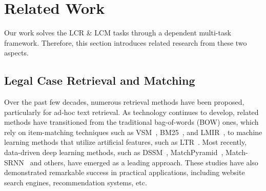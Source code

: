 \section{Related Work}
\label{sec:related_work}
Our work solves the LCR \& LCM tasks through a dependent multi-task framework.
Therefore, this section introduces related research from these two aspects.



\subsection{Legal Case Retrieval and Matching}
Over the past few decades, numerous retrieval methods have been proposed, particularly for ad-hoc text retrieval.
As technology continues to develop, related methods have transitioned from the traditional bag-of-words (BOW) ones, which rely on item-matching techniques such as VSM~\cite{salton1988VSM}, BM25~\cite{robertson1994BM25}, and LMIR~\cite{song1999LMIR}, to machine learning methods that utilize artificial features, such as LTR~\cite{liu2009LTR}.
Most recently, data-driven deep learning methods, such as DSSM~\cite{hu2014DSSM}, MatchPyramid~\cite{pang2016MatchPyramid}, Match-SRNN~\cite{wan2016Match-SRNN} and others, have emerged as a leading approach.
These studies have also demonstrated remarkable success in practical applications, including website search engines, recommendation systems, etc.

